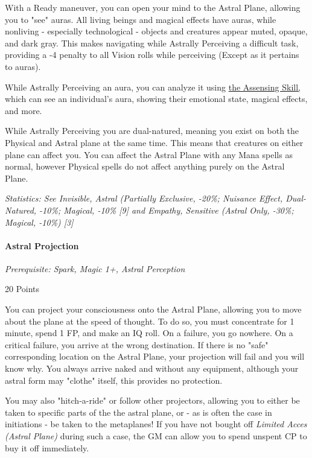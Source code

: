 \begin{multicols}{3}
	With a Ready maneuver, you can open your mind to the Astral Plane, allowing you to "see" auras. All living beings and magical effects have auras, while nonliving - especially technological - objects and creatures appear muted, opaque, and dark gray. This makes navigating while Astrally Perceiving a difficult task, providing a -4 penalty to all Vision rolls while perceiving (Except as it pertains to auras). 
	
	While Astrally Perceiving an aura, you can analyze it using \hyperref[assensing_skill]{the Assensing Skill,} which can see an individual's aura, showing their emotional state, magical effects, and more.
	
	While Astrally Perceiving you are dual-natured, meaning you exist on both the Physical and Astral plane at the same time. This means that creatures on either plane can affect you. You can affect the Astral Plane with any Mana spells as normal, however Physical spells do not affect anything purely on the Astral Plane.
	
	\textit{\textcolor{OliveGreen}{Statistics: See Invisible, Astral (Partially Exclusive, -20\%; Nuisance Effect, Dual-Natured, -10\%; Magical, -10\% [9] and Empathy, Sensitive (Astral Only, -30\%; Magical, -10\%) [3]}}
	
	\paragraph{Astral Projection}\label{astral_projection}
	\textit{Prerequisite: Spark, Magic 1+, Astral Perception}
	\begin{flushright}
		20 Points
	\end{flushright}
	
	You can project your consciousness onto the Astral Plane, allowing you to move about the plane at the speed of thought. To do so, you must concentrate for 1 minute, spend 1 FP, and make an IQ roll. On a failure, you go nowhere. On a critical failure, you arrive at the wrong destination. If there is no "safe" corresponding location on the Astral Plane, your projection will fail and you will know why. You always arrive naked and without any equipment, although your astral form may "clothe" itself, this provides no protection.
	
	You may also "hitch-a-ride" or follow other projectors, allowing you to either be taken to specific parts of the the astral plane, or - as is often the case in initiations - be taken to the metaplanes! If you have not bought off \textit{Limited Acces (Astral Plane)} during such a case, the GM can allow you to spend unspent CP to buy it off immediately.
	

\end{multicols}

